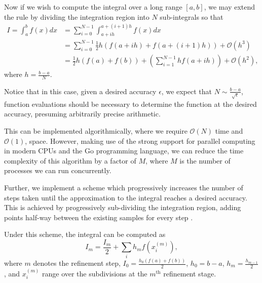 \documentclass[10pt, a4paper]{article}
\begin{document}

  Now if we wish to compute the integral over a long range $[a, b]$, we may extend the rule by dividing
  the integration region into $N$ sub-integrals so that
  \begin{equation}
  \begin{split}
  I = \int_a^b f(x) dx & = \sum_{i=0}^{N-1} \int_{a+ih}^{a+(i+1)h} f(x) dx \\
  & = \sum_{i=0}^{N-1} \frac{1}{2} h (f(a+ih) + f(a+(i+1)h)) + \mathcal{O}(h^3) \\
  & = \frac{1}{2} h (f(a) + f(b)) + \left( \sum_{i=1}^{N-1} h f(a+ih) \right) + \mathcal{O}(h^2),
  \end{split}
  \end{equation}
  where $h = \frac{b-a}{N}$.

  Notice that in this case, given a desired accuracy $\epsilon$, we expect that $N \sim \frac{b-a}{\sqrt{\epsilon}}$,
  function evaluations should be necessary to determine the function at the desired accuracy, presuming
  arbitrarily precise arithmetic.

  This can be implemented algorithmically, where we require $\mathcal{O}(N)$ time and $\mathcal{O}(1)$,
  space. However, making use of the strong support for parallel computing in modern CPUs and the Go
  programming language, we can reduce the time complexity of this algorithm by a factor of $M$, where $M$
  is the number of processes we can run concurrently\footnotemark.


  Further, we implement a scheme which progressively increases the number of steps taken until the
  approximation to the integral reaches a desired accuracy. This is achieved by progressively sub-dividing
  the integration region, adding points half-way between the existing samples for every step \cite{nr}.

  Under this scheme, the integral can be computed as
  \begin{equation}
  \label{eq:trap-rec}
  I_m = \frac{I_m}{2} + \sum_i h_m f(x^{(m)}_i),
  \end{equation}
  where $m$ denotes the refinement step, $I_0 = \frac{h_0 (f(a) + f(b))}{2}$, $h_0 = b-a$,
  $h_m = \frac{h_{m-1}}{2}$, and $x^{(m)}_i$
  range over the subdivisions at the $m^{\text{th}}$ refinement stage.
\end{document}

